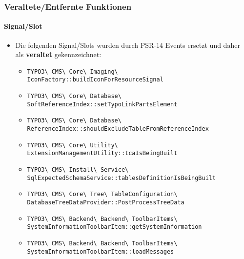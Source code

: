 \begin{frame}[fragile]
	\frametitle{Veraltete/Entfernte Funktionen}
	\framesubtitle{Signal/Slot}

	\lstset{basicstyle=\tiny\ttfamily}

	\begin{itemize}
		\item Die folgenden Signal/Slots wurden durch PSR-14 Events ersetzt und daher als \textbf{veraltet} gekennzeichnet:
			\newline

			\begin{itemize}\tiny
				\item \texttt{TYPO3\textbackslash
					CMS\textbackslash
					Core\textbackslash
					Imaging\textbackslash
					IconFactory::buildIconForResourceSignal}
					\newline
				\item \texttt{TYPO3\textbackslash
					CMS\textbackslash
					Core\textbackslash
					Database\textbackslash
					SoftReferenceIndex::setTypoLinkPartsElement}
					\newline
				\item \texttt{TYPO3\textbackslash
					CMS\textbackslash
					Core\textbackslash
					Database\textbackslash
					ReferenceIndex::shouldExcludeTableFromReferenceIndex}
					\newline
				\item \texttt{TYPO3\textbackslash
					CMS\textbackslash
					Core\textbackslash
					Utility\textbackslash
					ExtensionManagementUtility::tcaIsBeingBuilt}
					\newline
				\item \texttt{TYPO3\textbackslash
					CMS\textbackslash
					Install\textbackslash
					Service\textbackslash
					SqlExpectedSchemaService::tablesDefinitionIsBeingBuilt}
					\newline
				\item \texttt{TYPO3\textbackslash
					CMS\textbackslash
					Core\textbackslash
					Tree\textbackslash
					TableConfiguration\textbackslash
					DatabaseTreeDataProvider::PostProcessTreeData}
					\newline
				\item \texttt{TYPO3\textbackslash
					CMS\textbackslash
					Backend\textbackslash
					Backend\textbackslash
					ToolbarItems\textbackslash
					SystemInformationToolbarItem::getSystemInformation}
					\newline
				\item \texttt{TYPO3\textbackslash
					CMS\textbackslash
					Backend\textbackslash
					Backend\textbackslash
					ToolbarItems\textbackslash
					SystemInformationToolbarItem::loadMessages}

			\end{itemize}

	\end{itemize}

\end{frame}

